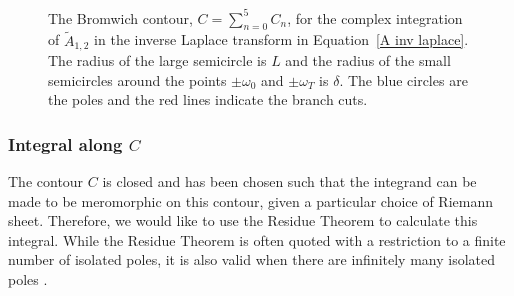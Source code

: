 \begin{figure}
{ 
	}
	\caption{The Bromwich contour, $C = \sum_{n = 0}^{5}C_n$, for the complex integration of $\tilde{A}_{1,2}$ in the inverse Laplace transform in Equation~\eqref{A inv laplace}. The radius of the large semicircle is $L$ and the radius of the small semicircles around the points $\pm \omega_0$ and $\pm \omega_T$ is $\delta$. The blue circles are the poles and the red lines indicate the branch cuts.}
	\label{fig: brom contour}
\end{figure}

\subsubsection{Integral along $C$}
The contour $C$ is closed and has been chosen such that the integrand can be made to be meromorphic on this contour, given a particular choice of Riemann sheet. Therefore, we would like to use the Residue Theorem to calculate this integral. While the Residue Theorem is often quoted with a restriction to a finite number of isolated poles, it is also valid when there are infinitely many isolated poles \citep{ahl79}.

